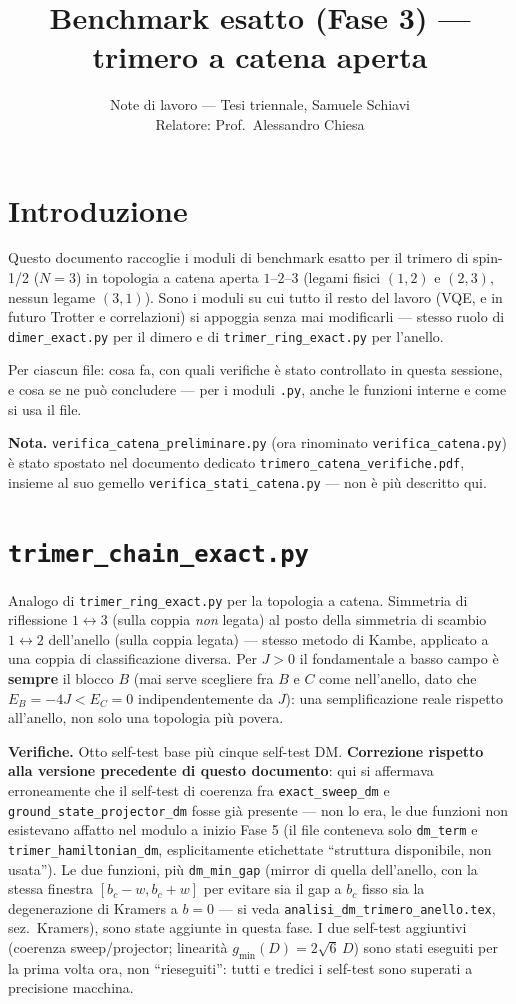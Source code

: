 \documentclass[11pt,a4paper]{article}
\title{Benchmark esatto (Fase 3) — trimero a catena aperta}
\author{Note di lavoro — Tesi triennale, Samuele Schiavi\\ Relatore: Prof.\ Alessandro Chiesa}
\date{}
\begin{document}
\maketitle

\section*{Introduzione}

Questo documento raccoglie i moduli di benchmark esatto per il trimero di spin-1/2
($N=3$) in topologia a catena aperta $1$–$2$–$3$ (legami fisici $(1,2)$ e $(2,3)$,
nessun legame $(3,1)$). Sono i moduli su cui tutto il resto del lavoro (VQE, e in
futuro Trotter e correlazioni) si appoggia senza mai modificarli — stesso ruolo di
\texttt{dimer\_exact.py} per il dimero e di \texttt{trimer\_ring\_exact.py} per
l'anello.

Per ciascun file: cosa fa, con quali verifiche è stato controllato in questa sessione,
e cosa se ne può concludere — per i moduli \texttt{.py}, anche le funzioni interne e
come si usa il file.

\textbf{Nota.} \texttt{verifica\_catena\_preliminare.py} (ora rinominato
\texttt{verifica\_catena.py}) è stato spostato nel documento dedicato
\texttt{trimero\_catena\_verifiche.pdf}, insieme al suo gemello
\texttt{verifica\_stati\_catena.py} — non è più descritto qui.

\section*{\texttt{trimer\_chain\_exact.py}}

Analogo di \texttt{trimer\_ring\_exact.py} per la topologia a catena. Simmetria di
riflessione $1\leftrightarrow3$ (sulla coppia \emph{non} legata) al posto della
simmetria di scambio $1\leftrightarrow2$ dell'anello (sulla coppia legata) — stesso
metodo di Kambe, applicato a una coppia di classificazione diversa. Per $J>0$ il
fondamentale a basso campo è \textbf{sempre} il blocco $B$ (mai serve scegliere fra
$B$ e $C$ come nell'anello, dato che $E_B=-4J<E_C=0$ indipendentemente da $J$): una
semplificazione reale rispetto all'anello, non solo una topologia più povera.

\textbf{Verifiche.} Otto self-test base più cinque self-test DM. \textbf{Correzione
rispetto alla versione precedente di questo documento}: qui si affermava erroneamente
che il self-test di coerenza fra \texttt{exact\_sweep\_dm} e
\texttt{ground\_state\_projector\_dm} fosse già presente — non lo era, le due funzioni
non esistevano affatto nel modulo a inizio Fase 5 (il file conteneva solo
\texttt{dm\_term} e \texttt{trimer\_hamiltonian\_dm}, esplicitamente etichettate
``struttura disponibile, non usata''). Le due funzioni, più \texttt{dm\_min\_gap}
(mirror di quella dell'anello, con la stessa finestra $[b_c-w,b_c+w]$ per evitare sia
il gap a $b_c$ fisso sia la degenerazione di Kramers a $b=0$ — si veda
\texttt{analisi\_dm\_trimero\_anello.tex}, sez.\ Kramers), sono state aggiunte in
questa fase. I due self-test aggiuntivi (coerenza sweep/projector; linearità
$g_\text{min}(D)=2\sqrt6\,D$) sono stati eseguiti per la prima volta ora, non
``rieseguiti'': tutti e tredici i self-test sono superati a precisione macchina.
\end{document}
